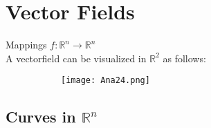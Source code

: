 \documentclass[8pt]{extreport}
\newcommand{\R}{\mathbb{R}}
\begin{document}
\section{ Vector Fields }
Mappings $f: \R^n \to \R^n$\\
A vectorfield can be visualized in $\R^2$ as follows:
\begin{figure}[H]
\centering
\begin{subfigure}[b]{0.4\linewidth}
\texttt{[image: Ana24.png]}
\end{subfigure}
\end{figure}

\subsection{Curves in $\R^n$}
\end{document}
